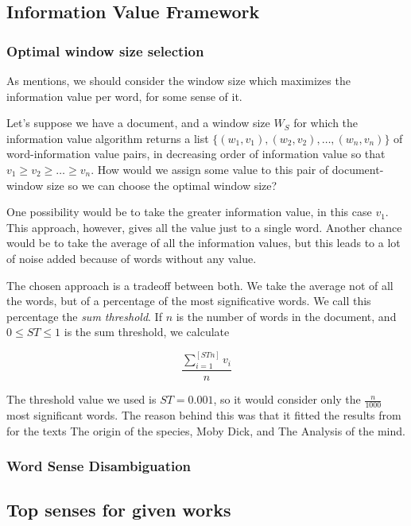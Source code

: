 \documentclass{pnastwo}
\begin{document}
\begin{article}
\subsection{Information Value Framework}
\medskip

\subsubsection{Optimal window size selection}
As \cite{DARWIN} mentions, we should consider the window size which maximizes the information value per word, for some sense of it.

Let's suppose we have a document, and a window size $W_S$ for which the information value algorithm returns a list $\{(w_1, v_1), (w_2, v_2), \dots ,(w_n, v_n) \}$ of word-information value pairs, in decreasing order of information value so that $v_1 \geq v_2 \geq \dots \geq v_n$. How would we assign some value to this pair of document-window size so we can choose the optimal window size?

One possibility would be to take the greater information value, in this case $v_1$. This approach, however, gives all the value just to a single word. Another chance would be to take the average of all the information values, but this leads to a lot of noise added because of words without any value.


The chosen approach is a tradeoff between both. We take the average not of all the words, but of a percentage of the most significative words. We call this percentage the \emph{sum threshold}. If $n$ is the number of words in the document, and $0 \leq ST \leq 1$ is the sum threshold, we calculate

\begin{equation}
  \frac{\sum_{i=1}^{[ST n]}v_i}{n} 
\end{equation}


The threshold value we used is $ST=0.001$, so it would consider only the $\frac{n}{1000}$ most significant words. The reason behind this was that it fitted the results from \cite{DARWIN} for the texts The origin of the species, Moby Dick, and  The Analysis of the mind.


\subsubsection{Word Sense Disambiguation}


\subsection{Top senses for given works}








\end{article}
\end{document}
